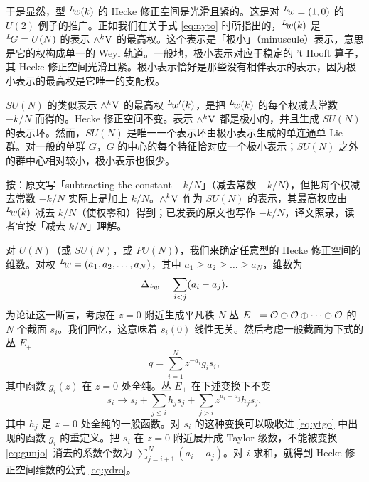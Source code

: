 于是显然，型 $^L\negthinspace w(k)$ 的 Hecke 修正空间是光滑且紧的。这是对 $^L\negthinspace w=(1,0)$ 的 $U(2)$ 例子的推广。正如我们在关于式 \eqref{eq:nyto} 时所指出的，$^L\negthinspace w(k)$ 是 $^L\negthinspace G=U(N)$ 的表示 $\wedge^k{{\mathrm{V}}}$ 的最高权。这个表示是「极小」（minuscule）表示，意思是它的权构成单一的 Weyl 轨道。一般地，极小表示对应于稳定的 't Hooft 算子，其 Hecke 修正空间光滑且紧。极小表示恰好是那些没有相伴表示的表示，因为极小表示的最高权是它唯一的支配权。

$SU(N)$ 的类似表示 $\wedge^k{{\mathrm{V}}}$ 的最高权 $^L\negthinspace w'(k)$，是把 $^L\negthinspace w(k)$ 的每个权减去常数 $-k/N$ 而得的。Hecke 修正空间不变。表示 $\wedge^k{{\mathrm{V}}}$ 都是极小的，并且生成 $SU(N)$ 的表示环。然而，$SU(N)$ 是唯一一个表示环由极小表示生成的单连通单 Lie 群。对一般的单群 $G$，$G$ 的中心的每个特征恰对应一个极小表示；$SU(N)$ 之外的群中心相对较小，极小表示也很少。

\begin{yizhu}[原文疑误]
按：原文写「subtracting the constant $-k/N$」（减去常数 $-k/N$），但把每个权减去常数 $-k/N$ 实际上是加上 $k/N$。$\wedge^k{{\mathrm{V}}}$ 作为 $SU(N)$ 的表示，其最高权应由 $^L\negthinspace w(k)$ 减去 $k/N$（使权零和）得到；已发表的原文也写作 $-k/N$，译文照录，读者宜按「减去 $k/N$」理解。
\end{yizhu}

\par{}

对 $U(N)$（或 $SU(N)$，或 $PU(N)$），我们来确定任意型的 Hecke 修正空间的维数。对权 $^L\negthinspace w=(a_1,a_2,\dots,a_N)$，其中 $a_1\geq a_2\geq \dots\geq a_N$，维数为
\setcounter{equation}{24}
\begin{equation}\label{eq:ydro}
\Delta_{^L\negthinspace w}=\sum_{i<j}(a_i-a_j).
\end{equation}
为论证这一断言，考虑在 $z=0$ 附近生成平凡秩 $N$ 丛 $E_-={\mathcal{O}}\oplus {\mathcal{O}}\oplus\dots\oplus {\mathcal{O}}$ 的 $N$ 个截面 $s_i$。我们回忆，这意味着 $s_i(0)$ 线性无关。然后考虑一般截面为下式的丛 $E_+$
\setcounter{equation}{25}
\begin{equation}\label{eq:ytgo}
q=\sum_{i=1}^Nz^{-a_i}g_is_i,
\end{equation}
其中函数 $g_i(z)$ 在 $z=0$ 处全纯。丛 $E_+$ 在下述变换下不变 %
\setcounter{equation}{26}
\begin{equation}\label{eq:gunjo}
s_i\to s_i+\sum_{j\leq
i}h_js_j+\sum_{j>i}z^{a_i-a_j}h_js_j,
\end{equation}
其中 $h_j$ 是 $z=0$ 处全纯的一般函数。对 $s_i$ 的这种变换可以吸收进 \eqref{eq:ytgo} 中出现的函数 $g_i$ 的重定义。把 $s_i$ 在 $z=0$ 附近展开成 Taylor 级数，不能被变换 \eqref{eq:gunjo}\ 消去的系数个数为 $\sum_{j=i+1}^N(a_i-a_j)$。对 $i$ 求和，就得到 Hecke 修正空间维数的公式 \eqref{eq:ydro}。
